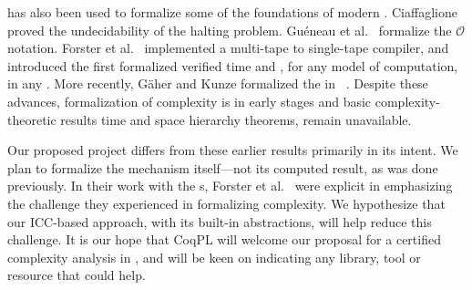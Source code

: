  has also been used to formalize some of the foundations of modern
. {Ciaffaglione}~\cite{ciaffaglione2016} proved the
undecidability of the halting problem. {Guéneau et
al.}~\cite{gueneau2018} formalize the \(\mathcal{O}\)
 notation. {Forster et al.}~\cite{forster2020}
implemented a multi-tape to single-tape compiler, and introduced the first
formalized  verified \wrt time and , for any model of computation, in any
. More recently, Gäher and Kunze formalized the
 in ~\cite{gaher2021}. Despite these advances,
formalization of complexity is in early stages and basic complexity-theoretic
results \eg time and space hierarchy theorems, remain unavailable.

Our proposed project differs from these earlier results primarily in its intent.
We plan to formalize the  mechanism itself---not its
computed result, as was done previously. In their work with the s, Forster et al.~\cite{forster2020} were explicit in emphasizing the
challenge they experienced in formalizing complexity. We hypothesize that our
ICC-based approach, with \eg its built-in abstractions, will help reduce this
challenge. It is our hope that CoqPL will welcome our proposal for a certified
complexity analysis in , and will be keen on indicating any
library, tool or resource that could help.
